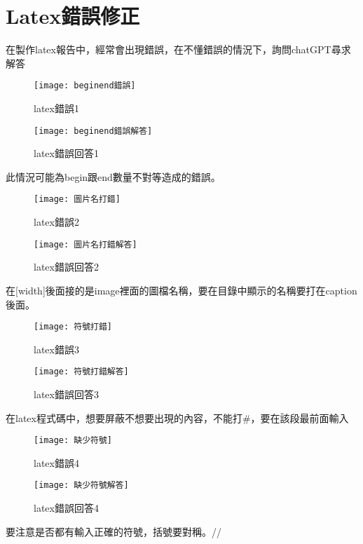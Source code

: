 \chapter{Latex錯誤修正}
在製作latex報告中，經常會出現錯誤，在不懂錯誤的情況下，詢問chatGPT尋求解答
\begin{figure}[ht]
  \begin{minipage}{0.5\textwidth}
    \centering
    \texttt{[image: beginend錯誤]}
    \caption{latex錯誤1}
  \end{minipage}%
  \begin{minipage}{0.5\textwidth}
    \centering
    \texttt{[image: beginend錯誤解答]}
    \caption{latex錯誤回答1}
  \end{minipage}
\end{figure}
此情況可能為begin跟end數量不對等造成的錯誤。\\
\begin{figure}[ht]
  \begin{minipage}{0.5\textwidth}
    \centering
    \texttt{[image: 圖片名打錯]}
    \caption{latex錯誤2}
  \end{minipage}%
  \begin{minipage}{0.5\textwidth}
    \centering
    \texttt{[image: 圖片名打錯解答]}
    \caption{latex錯誤回答2}
  \end{minipage}
\end{figure}
在[width]後面接的是image裡面的圖檔名稱，要在目錄中顯示的名稱要打在caption後面。\\

\begin{figure}[ht]
  \begin{minipage}{0.5\textwidth}
    \centering
    \texttt{[image: 符號打錯]}
    \caption{latex錯誤3}
  \end{minipage}%
  \begin{minipage}{0.5\textwidth}
    \centering
    \texttt{[image: 符號打錯解答]}
    \caption{latex錯誤回答3}
  \end{minipage}
\end{figure}
在latex程式碼中，想要屏蔽不想要出現的內容，不能打#，要在該段最前面輸入%

\begin{figure}[ht]
  \begin{minipage}{0.5\textwidth}
    \centering
    \texttt{[image: 缺少符號]}
    \caption{latex錯誤4}
  \end{minipage}%
  \begin{minipage}{0.5\textwidth}
    \centering
    \texttt{[image: 缺少符號解答]}
    \caption{latex錯誤回答4}
  \end{minipage}
\end{figure}
要注意是否都有輸入正確的符號，括號要對稱。//

